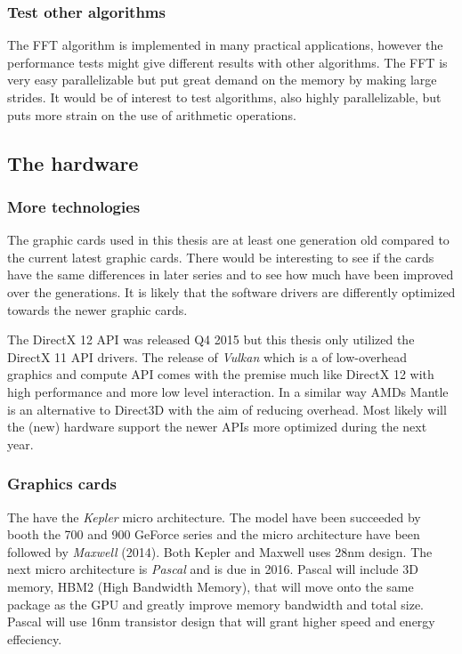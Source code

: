 \subsubsection{Test other algorithms}

The FFT algorithm is implemented in many practical applications, however the performance tests might give different results with other algorithms. The FFT is very easy parallelizable but put great demand on the memory by making large strides. It would be of interest to test algorithms, also highly parallelizable, but puts more strain on the use of arithmetic operations.

\subsection{The hardware}

\subsubsection{More technologies}

The graphic cards used in this thesis are at least one generation old compared to the current latest graphic cards. There would be interesting to see if the cards have the same differences in later series and to see how much have been improved over the generations. It is likely that the software drivers are differently optimized towards the newer graphic cards.

The DirectX 12 API was released Q4 2015 but this thesis only utilized the DirectX 11 API drivers. The release of \textit{Vulkan} which is a of low-overhead graphics and compute API comes with the premise much like DirectX 12 with high performance and more low level interaction. In a similar way AMDs Mantle is an alternative to Direct3D with the aim of reducing overhead. Most likely will the (new) hardware support the newer APIs more optimized during the next year.

\subsubsection{Graphics cards}

The {\NVCARD} have the \textit{Kepler} micro architecture. The model have been succeeded by booth the 700 and 900 GeForce series and the micro architecture have been followed by \textit{Maxwell} (2014). Both Kepler and Maxwell uses 28nm design. The next micro architecture is \textit{Pascal} and is due in 2016. Pascal will include 3D memory, HBM2 (High Bandwidth Memory), that will move onto the same package as the GPU and greatly improve memory bandwidth and total size. Pascal will use 16nm transistor design that will grant higher speed and energy effeciency.

